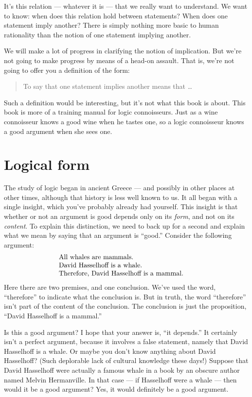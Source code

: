 It's this relation --- whatever it is --- that we really want to
understand.  We want to know: when does this relation hold between
statements?  When does one statement imply another?  There is simply
nothing more basic to human rationality than the notion of one
statement implying another.

We will make a lot of progress in clarifying the notion of
implication.  But we're not going to make progress by means of a
head-on assault.  That is, we're not going to offer you a definition
of the form:
\begin{quote} To say that one statement implies another means that
  \dots \end{quote} Such a definition would be interesting, but it's
not what this book is about.  This book is more of a training manual
for logic connoisseurs.  Just as a wine connoisseur knows a good wine
when he tastes one, so a logic connoisseur knows a good argument when
she sees one.


\section{Logical form}

The study of logic began in ancient Greece --- and possibly in other
places at other times, although that history is less well known to us.
It all began with a single insight, which you've probably already had
yourself.  This insight is that whether or not an argument is good
depends only on its \emph{form}, and not on its \emph{content}.  To
explain this distinction, we need to back up for a second and explain
what we mean by saying that an argument is ``good.''  Consider the
following argument:
\[ \begin{array}{p{7cm}}
  All whales are mammals. \\
  David Hasselhoff is a whale. \\
  Therefore, David Hasselhoff is a mammal. \end{array} \] 
Here there are two premises, and one conclusion.  We've used the word,
``therefore'' to indicate what the conclusion is.  But in truth, the
word ``therefore'' isn't part of the content of the conclusion.  The
conclusion is just the proposition, ``David Hasselhoff is a mammal.''

Is this a good argument?  I hope that your answer is, ``it depends.''
It certainly isn't a perfect argument, because it involves a false
statement, namely that David Hasselhoff is a whale.  Or maybe you don't
know anything about David Hasselhoff?  (Such deplorable lack of
cultural knowledge these days!)  Suppose that David Hasselhoff were
actually a famous whale in a book by an obscure author named Melvin
Hermanville.  In that case --- if Hasselhoff were a whale --- then would
it be a good argument?  Yes, it would definitely be a good argument.

